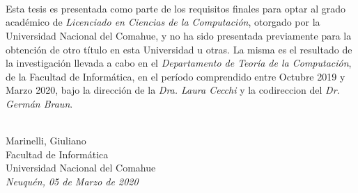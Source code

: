 \ \\
\ \\
\label{pagpref}
\\
\ \\
\ \\
\ \\
\ \\
\ \\

Esta tesis es presentada como parte de los requisitos finales para optar al grado académico de {\em Licenciado en Ciencias de la Computación}, otorgado por la Universidad Nacional del Comahue, y no ha sido presentada previamente para la obtención de otro título en esta Universidad u otras. La misma es el resultado de la investigación llevada a cabo en el \emph{Departamento de Teoría de la Computación}, de la Facultad de Informática, en el período comprendido entre Octubre 2019 y Marzo 2020, bajo la dirección de la \emph{Dra. Laura Cecchi} y la codireccion del \emph{Dr. Germán Braun}.



\vspace{3cm}


\ \\
{\flushright Marinelli, Giuliano \\
{\sc Facultad de Informática \\
Universidad Nacional del Comahue}\\
{\em Neuqu\'en, 05 de Marzo de 2020}\\}

\vfill

